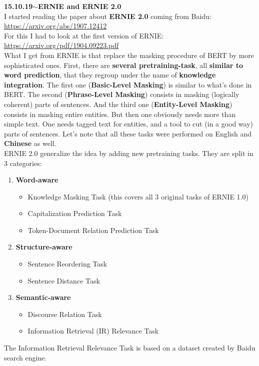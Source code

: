 \documentclass[11pt,a4paper]{article}
\newenvironment{loggentry}[2]%
{\noindent\textbf{#1}\hspace{1cm}$\mathbf{\sim}$\text{ }\textbf{#2}\\}{\vspace{0.5cm}}
\begin{document}
\begin{loggentry}{15.10.19}{ERNIE and ERNIE 2.0}

I started reading the paper about \textbf{ERNIE 2.0} coming from Baidu:\\
\url{https://arxiv.org/abs/1907.12412}\\
For this I had to look at the first version of ERNIE:\\
\url{https://arxiv.org/pdf/1904.09223.pdf}\\
What I get from ERNIE is that replace the masking procedure of BERT by more sophisticated ones. First, there are \textbf{several pretraining-task}, all \textbf{similar to word prediction}, that they regroup under the name of \textbf{knowledge integration}. The first one (\textbf{Basic-Level Masking}) is similar to what's done in BERT. The second (\textbf{Phrase-Level Masking}) consists in masking (logically coherent) parts of sentences. And the third one (\textbf{Entity-Level Masking}) consists in masking entire entities. But then one obviously needs more than simple text. One needs tagged text for entities, and a tool to cut (in a good way) parts of sentences. Let's note that all these tasks were performed on English and \textbf{Chinese} as well.\\
ERNIE 2.0 generalize the idea by adding new pretraining tasks. They are split in 3 categories:
\begin{enumerate}
\item \textbf{Word-aware}
\begin{itemize}
\item Knowledge Masking Task (this covers all 3 original tasks of ERNIE 1.0)
\item Capitalization Prediction Task
\item Token-Document Relation Prediction Task
\end{itemize}
\item \textbf{Structure-aware}
\begin{itemize}
\item Sentence Reordering Task
\item Sentence Distance Task
\end{itemize}
\item \textbf{Semantic-aware}
\begin{itemize}
\item Discourse Relation Task
\item Information Retrieval (IR) Relevance Task
\end{itemize}
\end{enumerate}
The Information Retrieval Relevance Task is based on a dataset created by Baidu search engine.\\

\end{loggentry}
\end{document}

